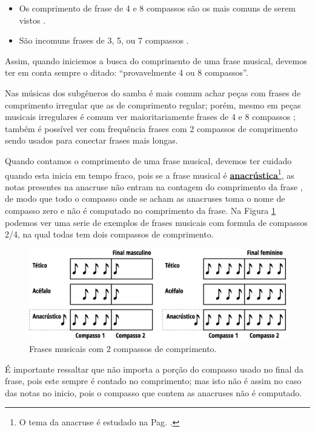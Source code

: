 \begin{itemize}
\item Os comprimento de frase de 4 e 8 compassos 
são os mais comuns de serem vistos
\cite[pp. 624]{latham2008diccionario} \cite[pp. 335]{medteoria} \cite[pp. 34]{bennett1993elementos} %
\cite[pp. 335]{medteoria} \cite[pp. 34]{bennett1993elementos}. %
\item São incomuns frases de 3, 5, ou 7 compassos \cite[pp. 34]{bennett1993elementos}.
\end{itemize}
Assim, quando iniciemos a busca do comprimento de uma frase musical,
devemos ter em conta sempre o ditado: ``provavelmente 4 ou 8 compassos''.


Nas músicas dos subgêneros do samba 
é mais comum achar peças com frases de comprimento irregular que as de comprimento regular;
porém, mesmo em peças musicais irregulares é comum ver maioritariamente frases de 4 e 8 compassos 
\cite[pp. 624]{latham2008diccionario} \cite[pp. 335]{medteoria} \cite[pp. 34]{bennett1993elementos} %
\cite[pp. 335]{medteoria} \cite[pp. 34]{bennett1993elementos}; %
também é possível ver com frequência frases com 2 compassos de comprimento 
\cite[pp. 34]{bennett1993elementos} %
sendo usados para conectar frases mais longas.



Quando contamos o comprimento de uma frase musical, 
devemos ter cuidado quando esta inicia em tempo fraco,
pois se a frase musical é \hyperref[subsub:anacrustica]{\textbf{anacrústica}}\footnote{O 
tema da anacruse é estudado na Pag. \pageref{subsub:anacrustica}.},
as notas presentes na anacruse não entram na contagem do comprimento da frase
\cite[pp. 148,150]{medteoria}, de modo que todo o compasso onde se acham as anacruses 
toma o nome de compasso zero e não é computado no comprimento da frase.
Na Figura \ref{fig:contagemtemposfrase} 
podemos ver uma serie de exemplos de frases musicais com formula de compassos 2/4, 
na qual todas tem dois compassos de comprimento.
\begin{figure}[!h]
    \centering
    \includegraphics[width=\textwidth]{chapters/cap-musicalidade/contagemcompassosfrase.eps}
    \caption{Frases musicais com 2 compassos de comprimento.}
    \label{fig:contagemtemposfrase}
\end{figure}
É importante ressaltar que não importa a porção do compasso usado no final da frase,
pois este sempre é contado no comprimento;
mas isto não é assim no caso das notas no inicio,
pois o compasso que contem as anacruses não é computado.


